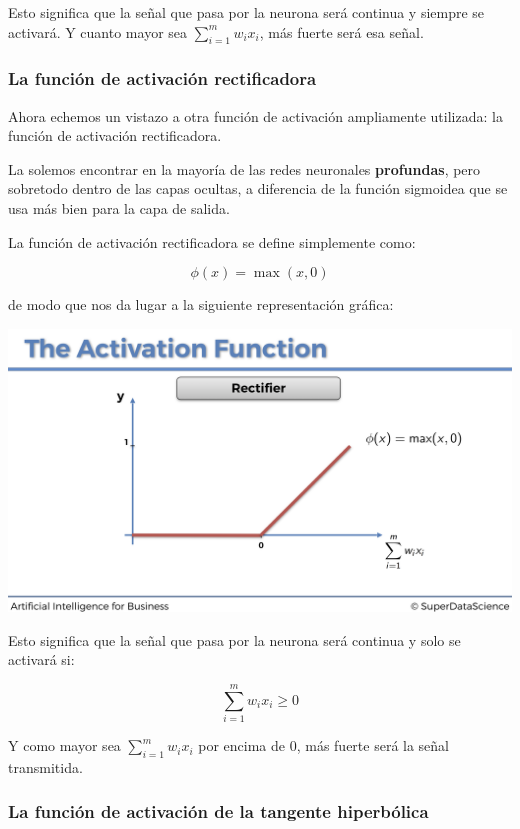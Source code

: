 \documentclass[]{book}
\begin{document}
Esto significa que la señal que pasa por la neurona será continua y siempre se activará. Y cuanto mayor sea \(\sum_{i = 1}^m w_i x_i\), más fuerte será esa señal.

\hypertarget{la-funciuxf3n-de-activaciuxf3n-rectificadora}{%
\subsubsection{La función de activación rectificadora}\label{la-funciuxf3n-de-activaciuxf3n-rectificadora}}

Ahora echemos un vistazo a otra función de activación ampliamente utilizada: la función de activación rectificadora.

La solemos encontrar en la mayoría de las redes neuronales \textbf{profundas}, pero sobretodo dentro de las capas ocultas, a diferencia de la función sigmoidea que se usa más bien para la capa de salida.

La función de activación rectificadora se define simplemente como:

\[\phi(x) = \max(x,0)\]

de modo que nos da lugar a la siguiente representación gráfica:

\includegraphics{Images/ANN_12.png}

Esto significa que la señal que pasa por la neurona será continua y solo se activará si:

\[\sum_{i=1}^m w_i x_i \ge 0\]

Y como mayor sea \(\sum_{i=1}^m w_i x_i\) por encima de 0, más fuerte será la señal transmitida.

\hypertarget{la-funciuxf3n-de-activaciuxf3n-de-la-tangente-hiperbuxf3lica}{%
\subsubsection{La función de activación de la tangente hiperbólica}\label{la-funciuxf3n-de-activaciuxf3n-de-la-tangente-hiperbuxf3lica}}
\end{document}
